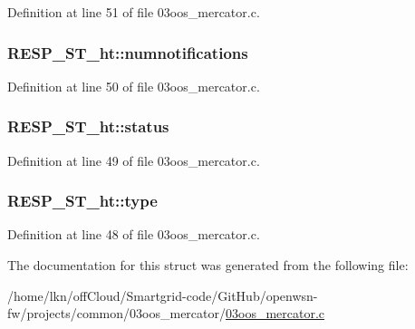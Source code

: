 Definition at line 51 of file 03oos\+\_\+mercator.\+c.

\subsubsection[{\texorpdfstring{numnotifications}{numnotifications}}]{ R\+E\+S\+P\+\_\+\+S\+T\+\_\+ht\+::numnotifications}\hypertarget{struct_r_e_s_p___s_t__ht_ac28e59c8cccb2b247ed31f64e11b1d7a}{}\label{struct_r_e_s_p___s_t__ht_ac28e59c8cccb2b247ed31f64e11b1d7a}


Definition at line 50 of file 03oos\+\_\+mercator.\+c.

\subsubsection[{\texorpdfstring{status}{status}}]{ R\+E\+S\+P\+\_\+\+S\+T\+\_\+ht\+::status}\hypertarget{struct_r_e_s_p___s_t__ht_adb3873f2c28de5b112e5c306b812938c}{}\label{struct_r_e_s_p___s_t__ht_adb3873f2c28de5b112e5c306b812938c}


Definition at line 49 of file 03oos\+\_\+mercator.\+c.

\subsubsection[{\texorpdfstring{type}{type}}]{ R\+E\+S\+P\+\_\+\+S\+T\+\_\+ht\+::type}\hypertarget{struct_r_e_s_p___s_t__ht_a5945569c8edf3063534e70fceda55209}{}\label{struct_r_e_s_p___s_t__ht_a5945569c8edf3063534e70fceda55209}


Definition at line 48 of file 03oos\+\_\+mercator.\+c.



The documentation for this struct was generated from the following file\+:\begin{DoxyCompactItemize}
\item 
/home/lkn/off\+Cloud/\+Smartgrid-\/code/\+Git\+Hub/openwsn-\/fw/projects/common/03oos\+\_\+mercator/\hyperlink{03oos__mercator_8c}{03oos\+\_\+mercator.\+c}\end{DoxyCompactItemize}
